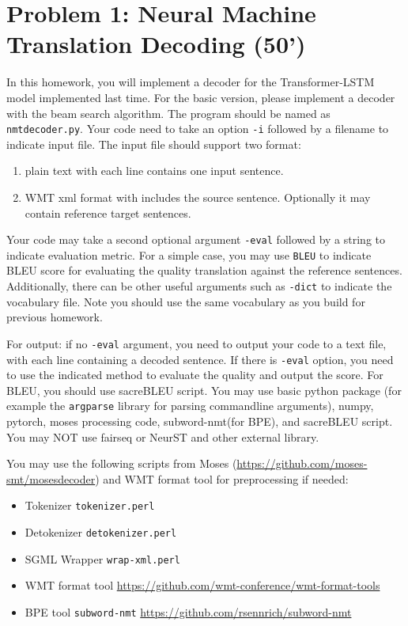 \documentclass[12pt,letterpaper]{article}
\begin{document}
\section*{Problem 1: Neural Machine Translation Decoding (50')} 
In this homework, you will implement a decoder for the Transformer-LSTM model 
implemented last time. 
For the basic version, please implement a decoder with the beam search algorithm. 
The program should be named as \texttt{nmtdecoder.py}.
Your code need to take an option \verb|-i| followed by a filename to indicate input file. 
The input file should support two format:
\begin{enumerate}
  \item plain text with each line contains one input sentence. 
  \item WMT xml format with includes the source sentence. Optionally it may contain reference target sentences. 
\end{enumerate}
Your code may take a second optional argument \verb|-eval| followed by a string to indicate evaluation metric. For a simple case, you may use \verb|BLEU| to indicate BLEU score for evaluating the quality translation against the reference sentences. 
Additionally, there can be other useful arguments such as \verb|-dict| to indicate the vocabulary file. Note you should use the same vocabulary as you build for previous homework. 

For output: if no \verb|-eval| argument, you need to output your code to a text file, with each line containing a decoded sentence. 
If there is \verb|-eval| option, you need to use the indicated method to evaluate the quality and output the score. 
For BLEU, you should use sacreBLEU script. 
You may use basic python package (for example the \texttt{argparse} library for parsing commandline arguments), numpy, pytorch, moses processing code, subword-nmt(for BPE), and sacreBLEU script. 
You may NOT use fairseq or NeurST and other external library. 


You may use the following scripts from Moses (\url{https://github.com/moses-smt/mosesdecoder}) and WMT format tool for preprocessing if needed:
\begin{itemize}
  \item Tokenizer \verb|tokenizer.perl|
  \item Detokenizer \verb|detokenizer.perl|
  \item SGML Wrapper \verb|wrap-xml.perl|
  \item WMT format tool \url{https://github.com/wmt-conference/wmt-format-tools}
  \item BPE tool \verb|subword-nmt| \url{https://github.com/rsennrich/subword-nmt}
\end{itemize}
\end{document}
